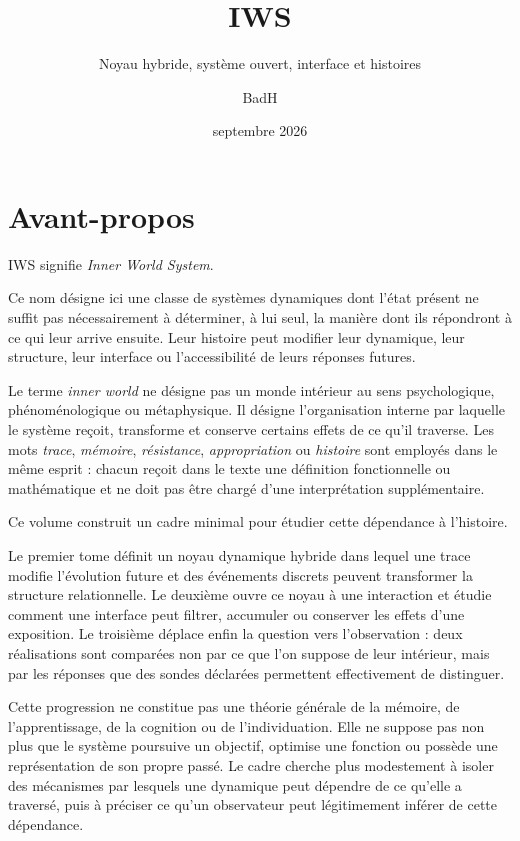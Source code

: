 \documentclass[
  11pt,
  a4paper,
  openany]{book}
\title{IWS}
\subtitle{Noyau hybride, système ouvert, interface et histoires}
\author{BadH}
\date{septembre 2026}
\theoremstyle{definition}
\newcounter{tome}
\begin{document}
\frontmatter
\maketitle

{
\setcounter{tocdepth}{1}
\tableofcontents
}
\mainmatter

\chapter*{Avant-propos}

IWS signifie \emph{Inner World System}.

Ce nom désigne ici une classe de systèmes dynamiques dont l'état présent ne suffit pas nécessairement à déterminer, à lui seul, la manière dont ils répondront à ce qui leur arrive ensuite. Leur histoire peut modifier leur dynamique, leur structure, leur interface ou l'accessibilité de leurs réponses futures.

Le terme \emph{inner world} ne désigne pas un monde intérieur au sens psychologique, phénoménologique ou métaphysique. Il désigne l'organisation interne par laquelle le système reçoit, transforme et conserve certains effets de ce qu'il traverse. Les mots \emph{trace}, \emph{mémoire}, \emph{résistance}, \emph{appropriation} ou \emph{histoire} sont employés dans le même esprit : chacun reçoit dans le texte une définition fonctionnelle ou mathématique et ne doit pas être chargé d'une interprétation supplémentaire.

Ce volume construit un cadre minimal pour étudier cette dépendance à l'histoire.

Le premier tome définit un noyau dynamique hybride dans lequel une trace modifie l'évolution future et des événements discrets peuvent transformer la structure relationnelle. Le deuxième ouvre ce noyau à une interaction et étudie comment une interface peut filtrer, accumuler ou conserver les effets d'une exposition. Le troisième déplace enfin la question vers l'observation : deux réalisations sont comparées non par ce que l'on suppose de leur intérieur, mais par les réponses que des sondes déclarées permettent effectivement de distinguer.

Cette progression ne constitue pas une théorie générale de la mémoire, de l'apprentissage, de la cognition ou de l'individuation. Elle ne suppose pas non plus que le système poursuive un objectif, optimise une fonction ou possède une représentation de son propre passé. Le cadre cherche plus modestement à isoler des mécanismes par lesquels une dynamique peut dépendre de ce qu'elle a traversé, puis à préciser ce qu'un observateur peut légitimement inférer de cette dépendance.
\end{document}
